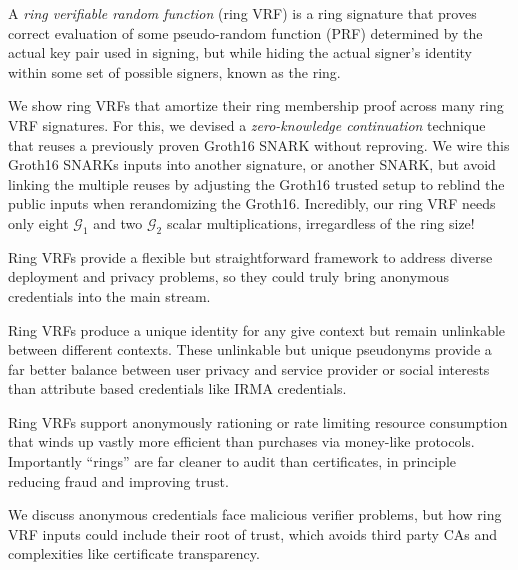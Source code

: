 A {\it ring verifiable random function} (ring VRF) is a ring signature
that proves correct evaluation of some pseudo-random function (PRF)
determined by the actual key pair used in signing, but while hiding
the actual signer's identity within some set of possible signers,
known as the ring.

\smallskip

We show ring VRFs that amortize their ring membership proof across many
ring VRF signatures.
%
For this, we devised a {\em zero-knowledge continuation} technique that
reuses a previously proven Groth16 SNARK without reproving.
We wire this Groth16 SNARKs inputs into another signature, or another SNARK, 
but avoid linking the multiple reuses by adjusting the Groth16 trusted setup
to reblind the public inputs when rerandomizing the Groth16.
%
Incredibly, our ring VRF needs only eight $\mathcal{G}_1$ and two
$\mathcal{G}_2$ scalar multiplications, irregardless of the ring size!

\smallskip

Ring VRFs provide a flexible  but straightforward framework to address
diverse deployment and privacy problems, so they could truly bring
anonymous credentials into the main stream.

Ring VRFs produce a unique identity for any give context but remain
unlinkable between different contexts.  These unlinkable but unique
pseudonyms provide a far better balance between user privacy and service
provider or social interests than attribute based credentials like IRMA credentials.

Ring VRFs support anonymously rationing or rate limiting resource
consumption that winds up vastly more efficient than purchases via
money-like protocols.  Importantly ``rings'' are far cleaner to audit
than certificates, in principle reducing fraud and improving trust.

We discuss anonymous credentials face malicious verifier problems,
but how ring VRF inputs could include their root of trust, which
avoids third party CAs and complexities like certificate transparency.
